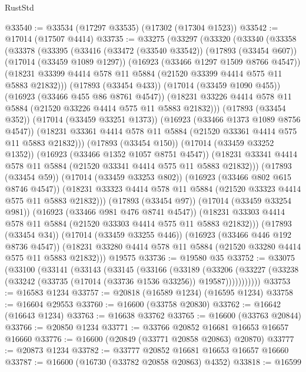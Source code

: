 \begin{lexlean}{RustStd}
\begin{coremodule}
{\begin{coremodule}
{{{{{{{{{{{{{{{{{{{{{{{{{{{{{{{{{{{{{{{{{{{{{{{{{{{{{{{@33540 := @33534 (@17297 @33535) (@17302 (@17304 @1523))
@33542 := @17014 (@17507 @4414)
@33735 := @33275
    (@33297
      (@33320
        (@33340
          (@33358
            (@33378
              (@33395
                (@33416
                  (@33472 (@33540 @33542))
                  (@17893 (@33454 @607))
                  (@17014 (@33459 @1089 @1297))
                  (@16923 (@33466 @1297 @1509 @8766 @4547))
                  (@18231 @33399 @4414 @578 @11 @5884 (@21520 @33399 @4414 @575 @11 @5883 @21832)))
                (@17893 (@33454 @433))
                (@17014 (@33459 @1090 @455))
                (@16923 (@33466 @455 @86 @8761 @4547))
                (@18231 @33226 @4414 @578 @11 @5884 (@21520 @33226 @4414 @575 @11 @5883 @21832)))
              (@17893 (@33454 @352))
              (@17014 (@33459 @33251 @1373))
              (@16923 (@33466 @1373 @1089 @8756 @4547))
              (@18231 @33361 @4414 @578 @11 @5884 (@21520 @33361 @4414 @575 @11 @5883 @21832)))
            (@17893 (@33454 @150))
            (@17014 (@33459 @33252 @1352))
            (@16923 (@33466 @1352 @1057 @8751 @4547))
            (@18231 @33341 @4414 @578 @11 @5884 (@21520 @33341 @4414 @575 @11 @5883 @21832)))
          (@17893 (@33454 @59))
          (@17014 (@33459 @33253 @802))
          (@16923 (@33466 @802 @615 @8746 @4547))
          (@18231 @33323 @4414 @578 @11 @5884 (@21520 @33323 @4414 @575 @11 @5883 @21832)))
        (@17893 (@33454 @97))
        (@17014 (@33459 @33254 @981))
        (@16923 (@33466 @981 @476 @8741 @4547))
        (@18231 @33303 @4414 @578 @11 @5884 (@21520 @33303 @4414 @575 @11 @5883 @21832)))
      (@17893 (@33454 @34))
      (@17014 (@33459 @33255 @446))
      (@16923 (@33466 @446 @192 @8736 @4547))
      (@18231 @33280 @4414 @578 @11 @5884 (@21520 @33280 @4414 @575 @11 @5883 @21832)))
    @19575
@33736 := @19580 @35
@33752 := @33075
    (@33100
      (@33141
        (@33143
          (@33145
            (@33166
              (@33189
                (@33206
                  (@33227 (@33238 (@33242 (@33735 (@17014 (@33736 @1536 @33256)) @19587)))))))))))
@33753 := @16583 @1234
@33757 := @20818 (@16589 @1234) (@16595 @1234)
@33758 := @16604 @29553
@33760 := @16600 (@33758 @20830)
@33762 := @16642 (@16643 @1234)
@33763 := @16638 @33762
@33765 := @16600 (@33763 @20844)
@33766 := @20850 @1234
@33771 := @33766 @20852 @16681 @16653 @16657 @16660
@33776 := @16600 (@20849 (@33771 @20858 @20863) @20870)
@33777 := @20873 @1234
@33782 := @33777 @20852 @16681 @16653 @16657 @16660
@33787 := @16600 (@16730 (@33782 @20858 @20863) @4352)
@33818 := @16599
}}}}}}}}}}}}}}}}}}}}}}}}}}}}}}}}}}}}}}}}}}}}}}}}}}}}}}}
\end{coremodule}}
\end{coremodule}
\end{lexlean}
